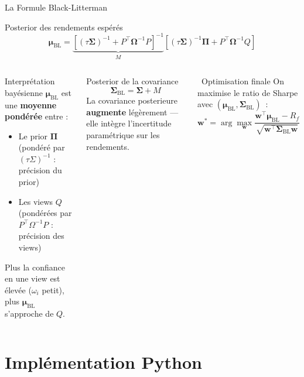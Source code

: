 \documentclass[aspectratio=169, 10pt, t]{beamer}
\newcommand{\blmu}{\boldsymbol{\mu}_{\mathrm{BL}}}
\newcommand{\sigbl}{\boldsymbol{\Sigma}_{\mathrm{BL}}}
\newcommand{\Piprior}{\boldsymbol{\Pi}}
\newcommand{\Omegav}{\boldsymbol{\Omega}}
\begin{document}
\begin{frame}[shrink=5]{La Formule Black-Litterman}
  \begin{block}{Posterior des rendements espérés}
    \[
      \blmu = \underbrace{\left[(\tau\boldsymbol{\Sigma})^{-1}
        + P^\top \Omegav^{-1} P\right]^{-1}}_{M}
      \left[(\tau\boldsymbol{\Sigma})^{-1} \Piprior
        + P^\top \Omegav^{-1} Q\right]
    \]
  \end{block}

  \vspace{0.3em}
  \begin{columns}[t]
      \begin{block}{Interprétation bayésienne}
        \small
        $\blmu$ est une \textbf{moyenne pondérée} entre :
        \begin{itemize}
          \setlength{\itemsep}{3pt}
          \item Le prior $\Piprior$ (pondéré par $(\tau\Sigma)^{-1}$ : précision du prior)
          \item Les views $Q$ (pondérées par $P^\top\Omega^{-1}P$ : précision des views)
        \end{itemize}
        \vspace{0.2em}
        Plus la confiance en une view est élevée ($\omega_i$ petit),
        plus $\blmu$ s'approche de $Q$.
      \end{block}
      \begin{block}{Posterior de la covariance}
        \[
          \sigbl = \boldsymbol{\Sigma} + M
        \]
        La covariance posterieure \textbf{augmente} légèrement — elle
        intègre l'incertitude paramétrique sur les rendements.
      \end{block}
      \vspace{0.3em}
      \begin{exampleblock}{\small\faCog\ Optimisation finale}
        \small
        On maximise le ratio de Sharpe avec $(\blmu, \sigbl)$~:
        \[
          \mathbf{w}^* = \arg\max_{\mathbf{w}} \frac{\mathbf{w}^\top\blmu - R_f}
          {\sqrt{\mathbf{w}^\top \sigbl \mathbf{w}}}
        \]
      \end{exampleblock}
  \end{columns}
\end{frame}

\section{Implémentation Python}
\end{document}
